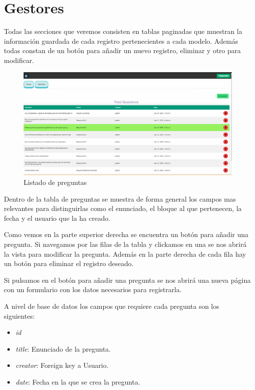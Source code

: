 \section{Gestores}

\vspace{1cm}


Todas las secciones que veremos consisten en tablas paginadas que muestran la información guardada de cada registro pertenecientes a cada modelo. Además todas constan de un botón para añadir un nuevo registro, eliminar y otro para modificar. \vspace{1cm}

\begin{figure}[!ht]
    \centering
    \includegraphics[width=1\textwidth]{imagenes/list_preguntas.png}
    \caption{ Listado de preguntas }
    \label{fig:enter-label}
\end{figure}\vspace{1cm}

Dentro de la tabla de preguntas se muestra de forma general los campos mas relevantes para distinguirlas como el enunciado, el bloque al que pertenecen, la fecha y el usuario que la ha creado. 

Como vemos en la parte superior derecha se encuentra un botón para añadir una pregunta. Si navegamos por las filas de la tabla y clickamos en una se nos abrirá la vista para modificar la pregunta. Además en la parte derecha de cada fila hay un botón para eliminar el registro deseado. 

Si pulsamos en el botón para añadir una pregunta se nos abrirá una nueva página con un formulario con los datos necesarios para registrarla. 
\vspace{1cm}

A nivel de base de datos los campos que requiere cada pregunta son los siguientes:

\begin{itemize}
    \item \textit{id}
    \item  \textit{title}: Enunciado de la pregunta.
    \item \textit{creator}: Foreign key a Usuario.
    \item \textit{date}: Fecha en la que se crea la pregunta. 
\end{itemize}

